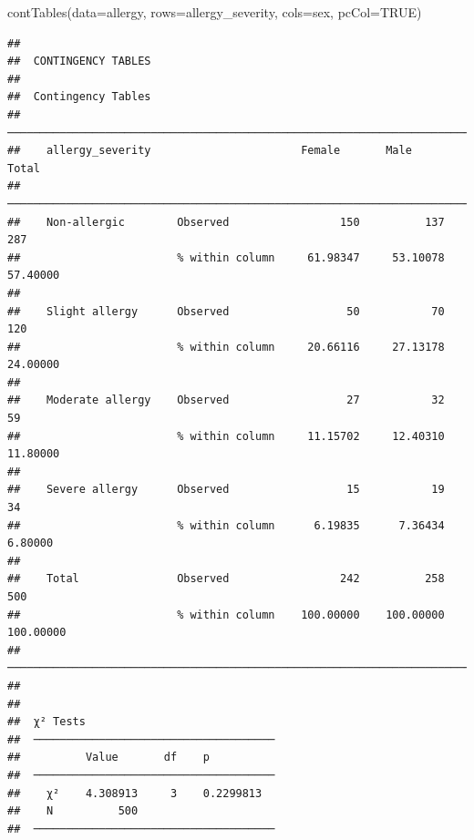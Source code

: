\documentclass[
]{memoir}
\newenvironment{Shaded}{\begin{snugshade}}{\end{snugshade}}
\newcommand{\AttributeTok}[1]{\textcolor[rgb]{0.77,0.63,0.00}{#1}}
\newcommand{\ConstantTok}[1]{\textcolor[rgb]{0.00,0.00,0.00}{#1}}
\newcommand{\FunctionTok}[1]{\textcolor[rgb]{0.00,0.00,0.00}{#1}}
\newcommand{\NormalTok}[1]{#1}
\begin{document}
\begin{Shaded}
\begin{Highlighting}[]
\FunctionTok{contTables}\NormalTok{(}\AttributeTok{data=}\NormalTok{allergy, }
           \AttributeTok{rows=}\NormalTok{allergy\_severity, }\AttributeTok{cols=}\NormalTok{sex, }
           \AttributeTok{pcCol=}\ConstantTok{TRUE}\NormalTok{)}
\end{Highlighting}
\end{Shaded}

\begin{verbatim}
## 
##  CONTINGENCY TABLES
## 
##  Contingency Tables                                                             
##  ────────────────────────────────────────────────────────────────────────────── 
##    allergy_severity                       Female       Male         Total       
##  ────────────────────────────────────────────────────────────────────────────── 
##    Non-allergic        Observed                 150          137          287   
##                        % within column     61.98347     53.10078     57.40000   
##                                                                                 
##    Slight allergy      Observed                  50           70          120   
##                        % within column     20.66116     27.13178     24.00000   
##                                                                                 
##    Moderate allergy    Observed                  27           32           59   
##                        % within column     11.15702     12.40310     11.80000   
##                                                                                 
##    Severe allergy      Observed                  15           19           34   
##                        % within column      6.19835      7.36434      6.80000   
##                                                                                 
##    Total               Observed                 242          258          500   
##                        % within column    100.00000    100.00000    100.00000   
##  ────────────────────────────────────────────────────────────────────────────── 
## 
## 
##  χ² Tests                              
##  ───────────────────────────────────── 
##          Value       df    p           
##  ───────────────────────────────────── 
##    χ²    4.308913     3    0.2299813   
##    N          500                      
##  ─────────────────────────────────────
\end{verbatim}
\end{document}
